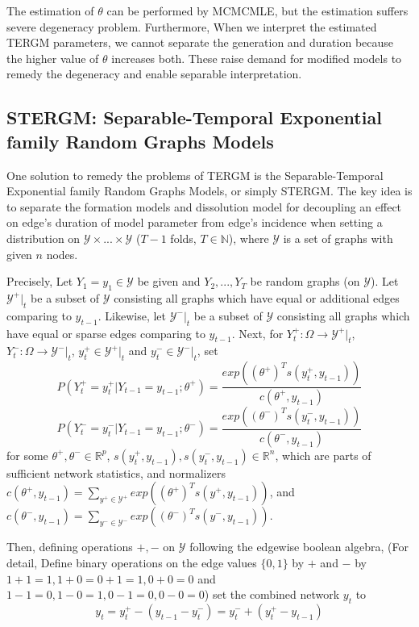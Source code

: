 \documentclass[aspectratio=169,ignorenonframetext,9pt]{beamer}
\theoremstyle{plain}
\theoremstyle{definition}
\begin{document}
The estimation of $\theta$ can be performed by MCMCMLE,
but the estimation suffers severe degeneracy problem.
Furthermore, When we interpret the estimated TERGM parameters,
we cannot separate the generation and duration because
the higher value of $\theta$ increases both.
These raise demand for modified models to remedy the degeneracy and enable separable interpretation.

\subsection{STERGM: Separable-Temporal Exponential family Random Graphs Models}
One solution to remedy the problems of TERGM is 
the Separable-Temporal Exponential family Random Graphs Models, or simply STERGM. %
The key idea is to separate the formation models and dissolution model
for decoupling an effect on edge's duration of model parameter from edge's incidence
when setting a distribution on $\mathcal{Y}\times ... \times \mathcal{Y}$ ($T-1$ folds, $T\in\mathbb{N}$),
where $\mathcal{Y}$ is a set of graphs with given $n$ nodes.

Precisely,
Let $Y_1=y_1 \in \mathcal{Y}$ be given and $Y_2,...,Y_T$ be random graphs (on $\mathcal{Y}$).
Let $\mathcal{Y}^+|_t$ be a subset of $\mathcal{Y}$ consisting all graphs which have equal or additional edges comparing to $y_{t-1}$.
Likewise, let $\mathcal{Y}^-|_t$ be a subset of $\mathcal{Y}$ consisting all graphs which have equal or sparse edges comparing to $y_{t-1}$.
Next, for $Y_t^+: \Omega \to\mathcal{Y}^+|_t$, $Y_t^-: \Omega \to\mathcal{Y}^-|_t$, $y_t^+ \in \mathcal{Y}^+|_t$ and $y_t^- \in \mathcal{Y}^-|_t$, set
\[P(Y_t^+=y_t^+|Y_{t-1}=y_{t-1};\theta^+) = \frac{exp((\theta^+)^{T}s(y_t^+, y_{t-1}))}{c(\theta^+, y_{t-1})}\]
\[P(Y_t^-=y_t^-|Y_{t-1}=y_{t-1};\theta^-) = \frac{exp((\theta^-)^{T}s(y_t^-, y_{t-1}))}{c(\theta^-, y_{t-1})}\]
for some $\theta^+,\theta^-\in\mathbb{R}^p$, $s(y_t^+, y_{t-1}), s(y_t^-, y_{t-1})\in\mathbb{R}^n$, which are parts of sufficient network statistics,
and normalizers $c(\theta^+, y_{t-1})=\sum_{y^+\in\mathcal{Y}^+}exp((\theta^+)^{T}s(y^+, y_{t-1}))$, 
and $c(\theta^-, y_{t-1})=\sum_{y^-\in\mathcal{Y}^-}exp((\theta^-)^{T}s(y^-, y_{t-1}))$.

Then, defining operations $+,-$ on $\mathcal{Y}$ following the edgewise boolean algebra,
(For detail, Define binary operations on the edge values $\{0,1\}$ by $+$ and $-$ 
by $1+1=1, 1+0=0+1=1, 0+0=0$ and $1-1=0, 1-0=1, 0-1=0, 0-0=0$) 
set the combined network $y_t$ to
\[y_t=y_t^+ - (y_{t-1} - y_t^-) = y_t^- + (y_t^+ - y_{t-1})\]
\end{document}
